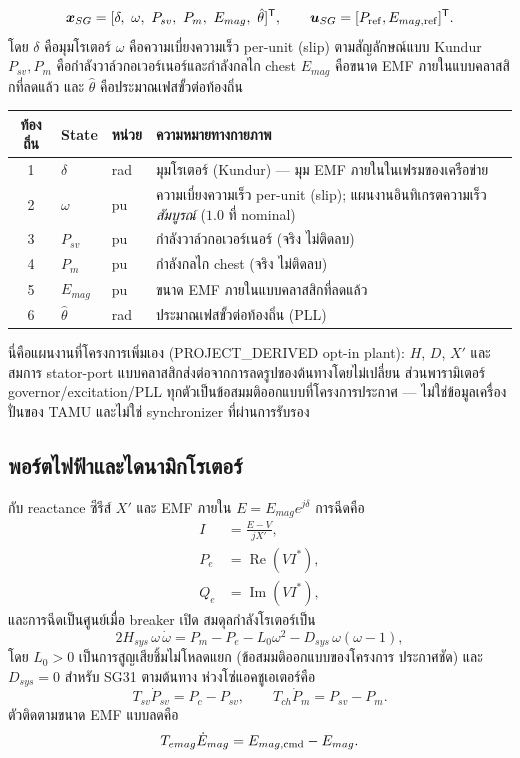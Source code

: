 \documentclass[12pt,a4paper]{article}
\newcommand{\vect}[1]{\boldsymbol{#1}}
\begin{document}
\[
\vect x_{SG}=[\delta,\ \omega,\ P_{sv},\ P_m,\ E_{mag},\ \hat\theta]^{\mathsf T},
\qquad \vect u_{SG}=[P_{\rm ref},E_{mag,\rm ref}]^{\mathsf T}.
\]
โดย $\delta$ คือมุมโรเตอร์ $\omega$ คือความเบี่ยงความเร็ว per-unit (slip)
ตามสัญลักษณ์แบบ Kundur $P_{sv},P_m$ คือกำลังวาล์วกอเวอร์เนอร์และกำลังกลไก
chest $E_{mag}$ คือขนาด EMF ภายในแบบคลาสสิกที่ลดแล้ว และ $\hat\theta$
คือประมาณเฟสขั้วต่อท้องถิ่น
\begin{center}\footnotesize
\begin{tabularx}{\textwidth}{c l l X}
\toprule
ท้องถิ่น & State & หน่วย & ความหมายทางกายภาพ\\\midrule
1 & $\delta$ & rad & มุมโรเตอร์ (Kundur) --- มุม EMF ภายในในเฟรมของเครือข่าย\\
2 & $\omega$ & pu & ความเบี่ยงความเร็ว per-unit (slip); แผนงานอินทิเกรตความเร็ว \emph{สัมบูรณ์} ($1.0$ ที่ nominal)\\
3 & $P_{sv}$ & pu & กำลังวาล์วกอเวอร์เนอร์ (จริง ไม่ติดลบ)\\
4 & $P_m$ & pu & กำลังกลไก chest (จริง ไม่ติดลบ)\\
5 & $E_{mag}$ & pu & ขนาด EMF ภายในแบบคลาสสิกที่ลดแล้ว\\
6 & $\hat\theta$ & rad & ประมาณเฟสขั้วต่อท้องถิ่น (PLL)\\
\bottomrule
\end{tabularx}
\end{center}
นี่คือแผนงานที่โครงการเพิ่มเอง (PROJECT\_DERIVED opt-in plant): $H$, $D$,
$X'$ และสมการ stator-port แบบคลาสสิกส่งต่อจากการลดรูปของต้นทางโดยไม่เปลี่ยน
ส่วนพารามิเตอร์ governor/excitation/PLL ทุกตัวเป็นข้อสมมติออกแบบที่โครงการประกาศ
--- ไม่ใช่ข้อมูลเครื่องปั่นของ TAMU และไม่ใช่ synchronizer ที่ผ่านการรับรอง

\subsection{พอร์ตไฟฟ้าและไดนามิกโรเตอร์}

กับ reactance ซีรีส์ $X'$ และ EMF ภายใน $E=E_{mag}e^{j\delta}$ การฉีดคือ
\begin{align}
I&=\frac{E-V}{jX'},\\
P_e&=\operatorname{Re}(V I^*),\\
Q_e&=\operatorname{Im}(V I^*),
\end{align}
และการฉีดเป็นศูนย์เมื่อ breaker เปิด สมดุลกำลังโรเตอร์เป็น
\[
2H_{sys}\,\omega\,\dot\omega
   =P_m-P_e-L_0\omega^2-D_{sys}\,\omega(\omega-1),
\]
โดย $L_0>0$ เป็นการสูญเสียชิ้มไม่โหลดแยก (ข้อสมมติออกแบบของโครงการ ประกาศชัด)
และ $D_{sys}=0$ สำหรับ SG31 ตามต้นทาง ห่วงโซ่แอคชูเอเตอร์คือ
\[
T_{sv}\dot P_{sv}=P_c-P_{sv},\qquad T_{ch}\dot P_m=P_{sv}-P_m.
\]
ตัวติดตามขนาด EMF แบบลดคือ
\[
T_{emag}\dot E_{mag}=E_{mag,\rm cmd}-E_{mag}.
\]
\end{document}
